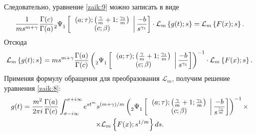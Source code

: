 Следовательно, уравнение \eqref{zaik:9} можно записать в виде
  $$\frac{1}{ms^{m+\gamma}}\frac{\Gamma(c)}{\Gamma(a)} 
  {\mathstrut}_2\Psi{\mathstrut}_1\left[\left.
  \begin{array}{c}
    (a;\tau); \left(\frac{\gamma}{m}+1;\frac{\gamma_1}{m}\right)\\
    (c;\beta)
  \end{array}\right| \frac{-b}{s^{\gamma_1}}\right]\cdot \mathcal L_m\left\{g(t);s\right\}=
\mathcal L_m\left\{F(x);s\right\}.$$
  Отсюда 
  $$\mathcal L_m\left\{g(t);s\right\}=ms^{m+\gamma}\frac{\Gamma(a)}{\Gamma(c)}\left(
  {\mathstrut}_2\Psi{\mathstrut}_1\left[\left.
  \begin{array}{c}
    (a;\tau); \left(\frac{\gamma}{m}+1;\frac{\gamma_1}{m}\right)\\
    (c;\beta)
  \end{array}\right| \frac{-b}{s^{\gamma_1}}\right]\right)^{-1}\cdot \mathcal L_m\left\{F(x);s\right\}.$$
  Применяя формулу обращения для преобразования $\mathcal L_m$, получим решение уравнения \eqref{zaik:8}:
\begin{multline*}
  g(t)=\frac{m^2}{2\pi i}\frac{\Gamma(a)}{\Gamma(c)}\int_{\sigma-i\infty}^{\sigma+i\infty}
  e^{st^m}s^{({m+\gamma})/{m}}
  \left(  {\mathstrut}_2\Psi{\mathstrut}_1\left[\left.
  \begin{array}{c}
    (a;\tau); \left(\frac{\gamma}{m}+1;\frac{\gamma_1}{m}\right)\\
    (c;\beta)
  \end{array}\right| \frac{-b}{s^{\frac{\gamma_1}{m}}}\right]\right)^{-1}\times \\
\times \mathcal L_m\left\{F(x);s^{{1}/{m}}\right\}ds.
\end{multline*}




